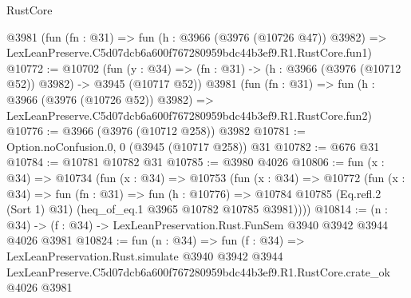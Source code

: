 \begin{lexlean}{RustCore}
\begin{coremodule}
    @3981
    (fun (fn : @31) =>
    fun (h : @3966 (@3976 (@10726 @47)) @3982) =>
    LexLeanPreserve.C5d07dcb6a600f767280959bdc44b3ef9.R1.RustCore.fun1)
@10772 := @10702
    (fun (y : @34) => (fn : @31) -> (h : @3966 (@3976 (@10712 @52)) @3982) -> @3945 (@10717 @52))
    @3981
    (fun (fn : @31) =>
    fun (h : @3966 (@3976 (@10726 @52)) @3982) =>
    LexLeanPreserve.C5d07dcb6a600f767280959bdc44b3ef9.R1.RustCore.fun2)
@10776 := @3966 (@3976 (@10712 @258)) @3982
@10781 := Option.noConfusion.{0, 0} (@3945 (@10717 @258)) @31
@10782 := @676 @31
@10784 := @10781 @10782 @31
@10785 := @3980 @4026
@10806 := fun (x : @34) =>
  @10734
    (fun (x : @34) =>
    @10753
      (fun (x : @34) =>
      @10772
        (fun (x : @34) =>
        fun (fn : @31) =>
        fun (h : @10776) =>
        @10784 @10785 (Eq.refl.{2} (Sort 1) @31) (heq_of_eq.{1} @3965 @10782 @10785 @3981))))
@10814 := (n : @34) -> (f : @34) -> LexLeanPreservation.Rust.FunSem @3940 @3942 @3944 @4026 @3981
@10824 := fun (n : @34) =>
  fun (f : @34) =>
  LexLeanPreservation.Rust.simulate
    @3940
    @3942
    @3944
    LexLeanPreserve.C5d07dcb6a600f767280959bdc44b3ef9.R1.RustCore.crate_ok
    @4026
    @3981
\end{coremodule}
\end{lexlean}

